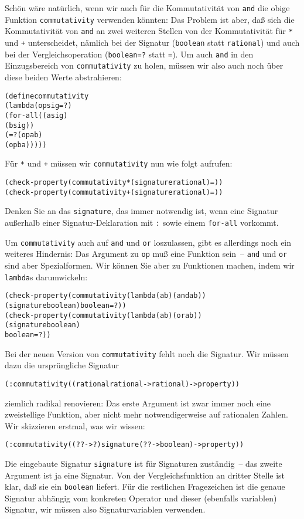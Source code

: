 Schön wäre natürlich, wenn wir auch für die Kommutativität von
\texttt{and} die obige Funktion \texttt{commutativity} verwenden
könnten: Das Problem ist aber, daß sich die Kommutativität von
\texttt{and} an zwei weiteren Stellen von der Kommutativität für
\texttt{*} und \texttt{+} unterscheidet, nämlich bei der Signatur
(\texttt{boolean} statt \texttt{rational}) und auch bei der
Vergleichsoperation (\texttt{boolean=?} statt \texttt{=}).  Um auch
\texttt{and} in den Einzugsbereich von \texttt{commutativity} zu
holen, müssen wir also auch noch über diese beiden Werte abstrahieren:
%
\begin{alltt}
(define commutativity
  (lambda (op sig =?)
    (for-all ((a sig)
              (b sig))
      (=? (op a b)
          (op b a)))))
\end{alltt}
%
Für \texttt{*} und \texttt{+} müssen wir \texttt{commutativity} nun
wie folgt aufrufen:
%
\begin{alltt}
(check-property (commutativity * (signature rational) =))
(check-property (commutativity + (signature rational) =))
\end{alltt}
%
Denken Sie an das \texttt{signature}, das immer notwendig ist, wenn
eine Signatur außerhalb einer Signatur-Deklaration mit \texttt{:} sowie
einem \texttt{for-all} vorkommt.

Um \texttt{commutativity} auch auf \texttt{and} und \texttt{or}
loszulassen, gibt es allerdings noch ein weiteres Hindernis: Das
Argument zu \texttt{op} muß eine Funktion sein~-- \texttt{and} und
\texttt{or} sind aber Spezialformen.  Wir können Sie aber zu
Funktionen machen, indem wir \texttt{lambda}s darumwickeln:
%
\begin{alltt}
(check-property (commutativity (lambda (a b) (and a b))
                               (signature boolean) boolean=?))
(check-property (commutativity (lambda (a b) (or a b))
                               (signature boolean)
                               boolean=?))
\end{alltt}
%
Bei der neuen Version von \texttt{commutativity} fehlt noch die
Signatur.  Wir müssen dazu die ursprüngliche Signatur
%
\begin{alltt}
(: commutativity ((rational rational -> rational) -> property))
\end{alltt}
%
ziemlich radikal renovieren: Das erste Argument ist zwar immer noch
eine zweistellige Funktion, aber nicht mehr notwendigerweise auf
rationalen Zahlen.  Wir skizzieren erstmal, was wir wissen:
%
\begin{alltt}
(: commutativity ((? ? -> ?) signature (? ? -> boolean) -> property))
\end{alltt}
%
Die eingebaute Signatur \texttt{signature} ist für Signaturen
zuständig~-- das zweite Argument ist ja eine Signatur.  Von der
Vergleichsfunktion an dritter Stelle ist klar, daß sie ein
\texttt{boolean} liefert.  Für die restlichen Fragezeichen ist die
genaue Signatur abhängig vom konkreten Operator und dieser (ebenfalls
variablen) Signatur, wir müssen also Signaturvariablen verwenden.

